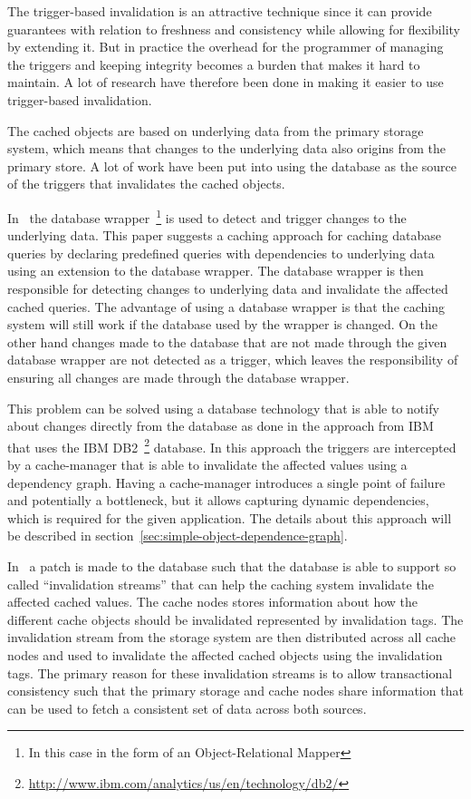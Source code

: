 The trigger-based invalidation is an attractive technique since it can provide guarantees with relation to freshness and consistency while allowing for flexibility by extending it. But in practice the overhead for the programmer of managing the triggers and keeping integrity becomes a burden that makes it hard to maintain. A lot of research have therefore been done in making it easier to use trigger-based invalidation.

The cached objects are based on underlying data from the primary storage system, which means that changes to the underlying data also origins from the primary store. A lot of work have been put into using the database as the source of the triggers that invalidates the cached objects.

In~\cite{paper:cache-genie} the database wrapper~\footnote{In this case in the form of an Object-Relational Mapper} is used to detect and trigger changes to the underlying data. This paper suggests a caching approach for caching database queries by declaring predefined queries with dependencies to underlying data using an extension to the database wrapper. The database wrapper is then responsible for detecting changes to underlying data and invalidate the affected cached queries. The advantage of using a database wrapper is that the caching system will still work if the database used by the wrapper is changed. On the other hand changes made to the database that are not made through the given database wrapper are not detected as a trigger, which leaves the responsibility of ensuring all changes are made through the database wrapper.

This problem can be solved using a database technology that is able to notify about changes directly from the database as done in the approach from IBM~\cite{paper:ibm, paper:ibm-extended} that uses the IBM DB2~\footnote{\url{http://www.ibm.com/analytics/us/en/technology/db2/}} database. In this approach the triggers are intercepted by a cache-manager that is able to invalidate the affected values using a dependency graph. Having a cache-manager introduces a single point of failure and potentially a bottleneck, but it allows capturing dynamic dependencies, which is required for the given application. The details about this approach will be described in section~\ref{sec:simple-object-dependence-graph}.

In~\cite{paper:liskov} a patch is made to the database such that the database is able to support so called ``invalidation streams'' that can help the caching system invalidate the affected cached values. The cache nodes stores information about how the different cache objects should be invalidated represented by invalidation tags. The invalidation stream from the storage system are then distributed across all cache nodes and used to invalidate the affected cached objects using the invalidation tags. The primary reason for these invalidation streams is to allow transactional consistency such that the primary storage and cache nodes share information that can be used to fetch a consistent set of data across both sources.

